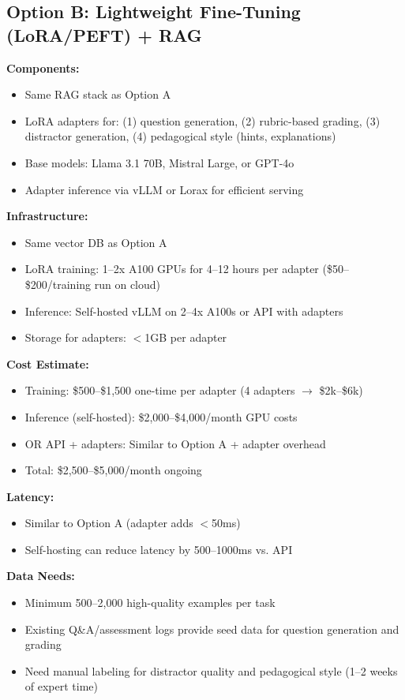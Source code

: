 \documentclass[11pt,letterpaper]{article}
\begin{document}
\subsection{Option B: Lightweight Fine-Tuning (LoRA/PEFT) + RAG}

\textbf{Components:}
\begin{itemize}
\item Same RAG stack as Option A
\item LoRA adapters for: (1) question generation, (2) rubric-based grading, (3) distractor generation, (4) pedagogical style (hints, explanations)
\item Base models: Llama 3.1 70B, Mistral Large, or GPT-4o
\item Adapter inference via vLLM or Lorax for efficient serving
\end{itemize}

\textbf{Infrastructure:}
\begin{itemize}
\item Same vector DB as Option A
\item LoRA training: 1--2x A100 GPUs for 4--12 hours per adapter (\$50--\$200/training run on cloud)
\item Inference: Self-hosted vLLM on 2--4x A100s or API with adapters
\item Storage for adapters: $<$1GB per adapter
\end{itemize}

\textbf{Cost Estimate:}
\begin{itemize}
\item Training: \$500--\$1,500 one-time per adapter (4 adapters $\rightarrow$ \$2k--\$6k)
\item Inference (self-hosted): \$2,000--\$4,000/month GPU costs
\item OR API + adapters: Similar to Option A + adapter overhead
\item Total: \$2,500--\$5,000/month ongoing
\end{itemize}

\textbf{Latency:}
\begin{itemize}
\item Similar to Option A (adapter adds $<$50ms)
\item Self-hosting can reduce latency by 500--1000ms vs. API
\end{itemize}

\textbf{Data Needs:}
\begin{itemize}
\item Minimum 500--2,000 high-quality examples per task
\item Existing Q\&A/assessment logs provide seed data for question generation and grading
\item Need manual labeling for distractor quality and pedagogical style (1--2 weeks of expert time)
\end{itemize}
\end{document}
